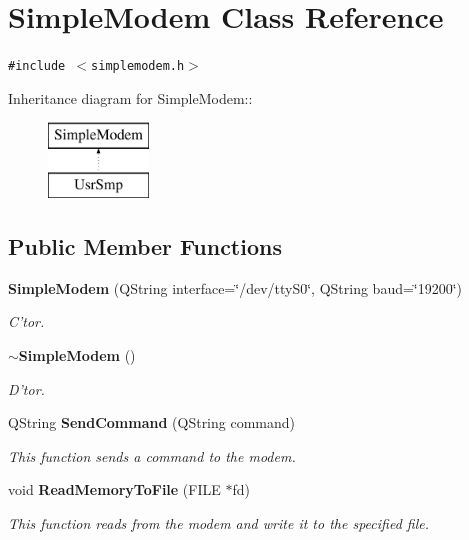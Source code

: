 \section{Simple\-Modem Class Reference}
\label{classSimpleModem}
{\tt \#include $<$simplemodem.h$>$}

Inheritance diagram for Simple\-Modem::\begin{figure}[H]
\begin{center}
\leavevmode
\includegraphics[height=2cm]{classSimpleModem}
\end{center}
\end{figure}
\subsection*{Public Member Functions}
\begin{CompactItemize}
\item 
{\bf Simple\-Modem} (QString interface=\char`\"{}/dev/tty\-S0\char`\"{}, QString baud=\char`\"{}19200\char`\"{})
\begin{CompactList}\small\item\em C'tor. \item\end{CompactList}\item 
{\bf $\sim$Simple\-Modem} ()\label{classSimpleModem_a1}

\begin{CompactList}\small\item\em D'tor. \item\end{CompactList}\item 
QString {\bf Send\-Command} (QString command)
\begin{CompactList}\small\item\em This function sends a command to the modem. \item\end{CompactList}\item 
void {\bf Read\-Memory\-To\-File} (FILE $\ast$fd)
\begin{CompactList}\small\item\em This function reads from the modem and write it to the specified file. \item\end{CompactList}\end{CompactItemize}


